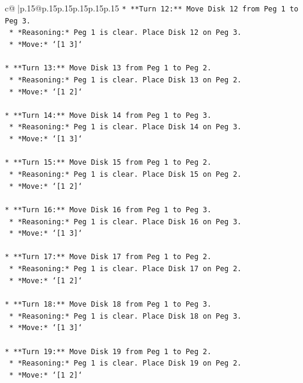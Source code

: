 \documentclass{article}
\begin{document}
{\begin{supertabular}{c@{$\;$}|p{.15\linewidth}@{}p{.15\linewidth}p{.15\linewidth}p{.15\linewidth}p{.15\linewidth}p{.15\linewidth}}
{{{\texttt{*   **Turn 12:** Move Disk 12 from Peg 1 to Peg 3.} \\
\texttt{    *   *Reasoning:* Peg 1 is clear. Place Disk 12 on Peg 3.} \\
\texttt{    *   *Move:* `{[}1 3{]}`} \\
\\ 
\texttt{*   **Turn 13:** Move Disk 13 from Peg 1 to Peg 2.} \\
\texttt{    *   *Reasoning:* Peg 1 is clear. Place Disk 13 on Peg 2.} \\
\texttt{    *   *Move:* `{[}1 2{]}`} \\
\\ 
\texttt{*   **Turn 14:** Move Disk 14 from Peg 1 to Peg 3.} \\
\texttt{    *   *Reasoning:* Peg 1 is clear. Place Disk 14 on Peg 3.} \\
\texttt{    *   *Move:* `{[}1 3{]}`} \\
\\ 
\texttt{*   **Turn 15:** Move Disk 15 from Peg 1 to Peg 2.} \\
\texttt{    *   *Reasoning:* Peg 1 is clear. Place Disk 15 on Peg 2.} \\
\texttt{    *   *Move:* `{[}1 2{]}`} \\
\\ 
\texttt{*   **Turn 16:** Move Disk 16 from Peg 1 to Peg 3.} \\
\texttt{    *   *Reasoning:* Peg 1 is clear. Place Disk 16 on Peg 3.} \\
\texttt{    *   *Move:* `{[}1 3{]}`} \\
\\ 
\texttt{*   **Turn 17:** Move Disk 17 from Peg 1 to Peg 2.} \\
\texttt{    *   *Reasoning:* Peg 1 is clear. Place Disk 17 on Peg 2.} \\
\texttt{    *   *Move:* `{[}1 2{]}`} \\
\\ 
\texttt{*   **Turn 18:** Move Disk 18 from Peg 1 to Peg 3.} \\
\texttt{    *   *Reasoning:* Peg 1 is clear. Place Disk 18 on Peg 3.} \\
\texttt{    *   *Move:* `{[}1 3{]}`} \\
\\ 
\texttt{*   **Turn 19:** Move Disk 19 from Peg 1 to Peg 2.} \\
\texttt{    *   *Reasoning:* Peg 1 is clear. Place Disk 19 on Peg 2.} \\
\texttt{    *   *Move:* `{[}1 2{]}`} \\
}}}
\end{supertabular}}
\end{document}

